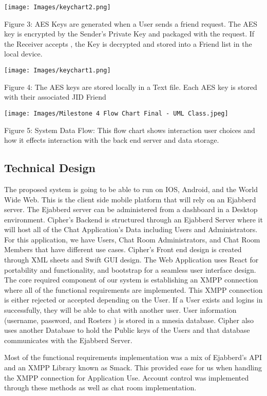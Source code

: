 \documentclass[12pt]{article}
\begin{document}
\texttt{[image: Images/keychart2.png]}
\newline

\centering Figure 3: AES Keys are generated when a User sends a friend request. The AES key is encrypted by the Sender’s Private Key and packaged with the request. If the Receiver accepts , the Key is decrypted and stored into a Friend list in the local device. 

\centering
\texttt{[image: Images/keychart1.png]}

Figure 4: The AES keys are stored locally in a Text file. Each AES key is stored with their associated JID Friend

\texttt{[image: Images/Milestone 4 Flow Chart Final - UML Class.jpeg]}

Figure 5: System Data Flow: 
This flow chart shows interaction user choices and how it effects interaction with the back end server and data storage. 

\RaggedRight\subsection{Technical Design}\label{sec:design}
The proposed system is going to be able to run on IOS, Android, and the World Wide Web. This is the client side mobile platform that will rely on an Ejabberd server. The Ejabberd server can be administered from a dashboard in a Desktop environment. Cipher’s Backend is structured through an Ejabberd Server where it will host all of the Chat Application’s Data including Users and Administrators. For this application, we have Users, Chat Room Administrators, and  Chat Room Members that have different use cases. Cipher’s Front end design is created through XML sheets and Swift GUI design. The Web Application uses React for portability and functionality, and bootstrap for a seamless user interface design. The core required component of our system is establishing an XMPP connection where all of the functional requirements are implemented. This XMPP connection is either rejected or accepted depending on the User. If a User exists and logins in successfully, they will be able to chat with another user. User information (username, password, and Rosters ) is stored in a mnesia database. Cipher also uses another Database to hold the Public keys of the Users and that database communicates with the Ejabberd Server.

Most of the functional requirements implementation was a mix of Ejabberd’s API  and an XMPP Library known as Smack. This provided ease for us when handling the XMPP connection for Application Use. Account control was implemented through these methods as well as chat room implementation.
\end{document}
